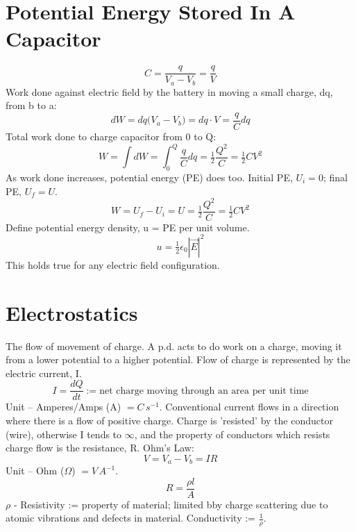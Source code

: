 \documentclass[a4paper, 11pt, normalem]{report}
\begin{document}
\section{Potential Energy Stored In A Capacitor}
\begin{equation}
    C = \frac{q}{V_{a} - V_{b}} = \frac{q}{V}
\end{equation}
Work done against electric field by the battery in moving a small charge, dq, from b to a:
\begin{equation}
    dW = dq\big(V_{a} - V_{b}\big) = dq \cdot V = \frac{q}{C}dq
\end{equation}
Total work done to charge capacitor from 0 to Q:
\begin{equation}
    W = \int dW = \int_{0}^{Q} \frac{q}{C} dq = \tfrac{1}{2} \frac{Q^{2}}{C} = \tfrac{1}{2}CV^{2}
\end{equation}
As work done increases, potential energy (PE) does too. Initial PE, $U_{i} = 0$; final PE, $U_{f} = U$.
\begin{equation}
    W = U_{f} - U_{i} = U = \tfrac{1}{2}\frac{Q^{2}}{C} = \tfrac{1}{2}CV^{2}
\end{equation}
Define potential energy density, u = PE per unit volume.
\begin{equation}
    u = \tfrac{1}{2}\epsilon_{0}|\vec{E}|^{2}
\end{equation}
This holds true for any electric field configuration.

\section{Electrostatics}
The flow of movement of charge. 
A p.d. acts to do work on a charge, moving it from a lower potential to a higher potential. 
Flow of charge is represented by the electric current, I.
\begin{equation}
    I = \frac{dQ}{dt} := \text{net charge moving through an area per unit time}
\end{equation}
Unit -- Amperes/Amps (A) $= C\,s^{-1}$.
Conventional current flows in a direction where there is a flow of positive charge. 
Charge is 'resisted' by the conductor (wire), otherwise I tends to $\infty$, and the property of conductors which resists charge flow is the resistance, R. 
Ohm's Law:
\begin{equation}
    V = V_{a} - V_{b} = IR
\end{equation}
Unit -- Ohm ($\Omega$) $= V\,A^{-1}$.
\begin{equation}
    R = \frac{\rho l}{A}
\end{equation}
$\rho$ - Resistivity := property of material; limited bby charge scattering due to atomic vibrations and defects in material. 
Conductivity := $\frac{1}{\rho}$.
\end{document}
